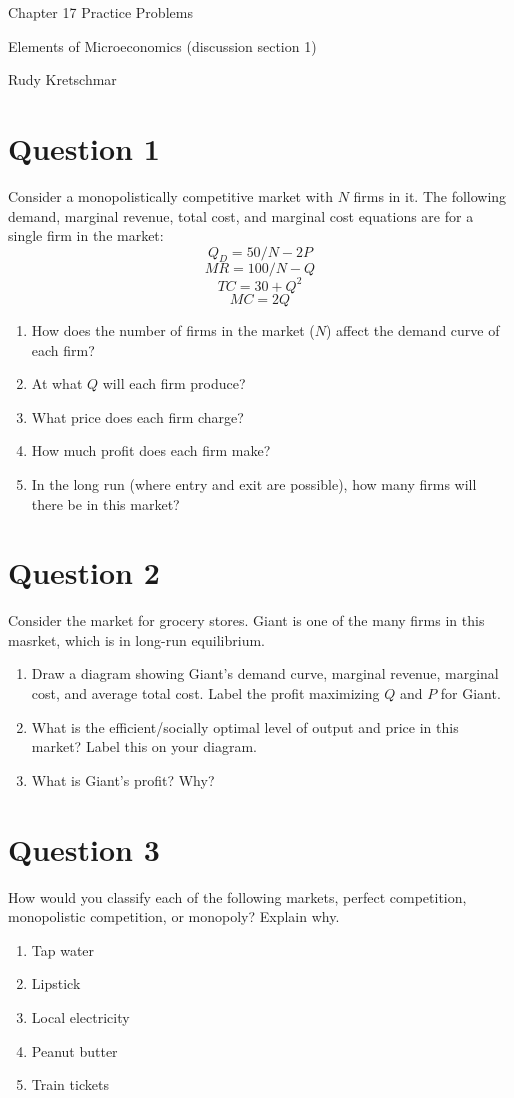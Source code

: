 \documentclass[12pt]{article}
\begin{document}
\begin{center}
\Large Chapter 17 Practice Problems

\medskip

\normalsize Elements of Microeconomics (discussion section 1)

\medskip

\small Rudy Kretschmar
\end{center}

\section*{Question 1}
Consider a monopolistically competitive market with $N$ firms in it. The following demand, marginal revenue, total cost, and marginal cost equations are for a single firm in the market:
\[Q_D = 50/N - 2P\]
\[MR = 100/N - Q\]
\[TC = 30 + Q^2\]
\[MC = 2Q\]
\begin{enumerate}[label = (\alph*)]
    \item How does the number of firms in the market ($N$) affect the demand curve of each firm?
    \item At what $Q$ will each firm produce? 
    \item What price does each firm charge?
    \item How much profit does each firm make?
    \item In the long run (where entry and exit are possible), how many firms will there be in this market?
\end{enumerate}

\section*{Question 2}
Consider the market for grocery stores. Giant is one of the many firms in this masrket, which is in long-run equilibrium.
\begin{enumerate}[label = (\alph*)]
    \item Draw a diagram showing Giant's demand curve, marginal revenue, marginal cost, and average total cost. Label the profit maximizing  $Q$ and $P$ for Giant.
    \item What is the efficient/socially optimal level of output and price in this market? Label this on your diagram.
    \item What is Giant's profit? Why?
\end{enumerate}

\newpage
\section*{Question 3}
How would you classify each of the following markets, perfect competition, monopolistic competition, or monopoly? Explain why.
\begin{enumerate}[label = (\alph*)]
    \item Tap water
    \item Lipstick
    \item Local electricity
    \item Peanut butter
    \item Train tickets
\end{enumerate}
\end{document}
